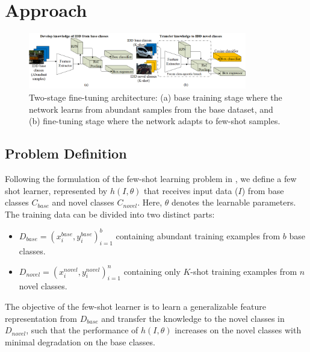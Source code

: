 \documentclass[letterpaper]{article} %
\begin{document}
\section{Approach}
\label{approach}
\begin{figure}[t]
      \centering
      \includegraphics[width=0.85\textwidth]{two_stage_finetune}
      \caption{Two-stage fine-tuning architecture: (a) base training stage where the network learns from abundant samples from the base dataset, and (b) fine-tuning stage where the network adapts to few-shot samples.}
      \label{fig_tfa}
\end{figure}

\subsection{Problem Definition}
\label{approach:prob_def}
Following the formulation of the few-shot learning problem in \cite{reweight,metarcnn}, we define a few shot learner, represented by $h(I,\theta)$ that receives input data ($I$) from base classes $C_{base}$ and novel classes $C_{novel}$. Here, $\theta$ denotes the learnable parameters. The training data can be divided into two distinct parts:
\begin{itemize}
      \item $D_{base} = {(x_{i}^{base}, y_{i}^{base})}_{i=1}^{b}$ containing abundant training examples from $b$ base classes.
      \item $D_{novel} = {(x_{i}^{novel}, y_{i}^{novel})}_{i=1}^{n}$ containing only $K$-shot training examples from $n$ novel classes.
\end{itemize}
The objective of the few-shot learner is to learn a generalizable feature representation from $D_{base}$ and transfer the knowledge to the novel classes in $D_{novel}$, such that the performance of $h(I,\theta)$ increases on the novel classes with minimal degradation on the base classes.
\end{document}
